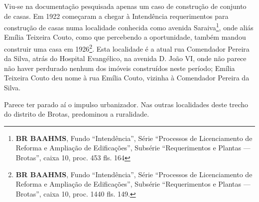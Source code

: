Viu-se na documentação pesquisada apenas um caso de construção de conjunto de casas. Em 1922 começaram a chegar à Intendência requerimentos para construção de casas numa localidade conhecida como avenida Saraiva\footnote{\textbf{BR BAAHMS}, Fundo ``Intendência'', Série ``Processos de Licenciamento de Reforma e Ampliação de Edificações'', Subsérie ``Requerimentos e Plantas --- Brotas'', caixa 10, proc. 453 fls. 164}, onde aliás Emília Teixeira Couto, como que percebendo a oportunidade, também mandou construir uma casa em 1926\footnote{\textbf{BR BAAHMS}, Fundo ``Intendência'', Série ``Processos de Licenciamento de Reforma e Ampliação de Edificações'', Subsérie ``Requerimentos e Plantas --- Brotas'', caixa 10, proc. 1440 fls. 149.}. Esta localidade é a atual rua Comendador Pereira da Silva, atrás do Hospital Evangélico, na avenida D. João VI, onde não parece não haver perdurado nenhum dos imóveis construídos neste período; Emília Teixeira Couto deu nome à rua Emília Couto, vizinha à Comendador Pereira da Silva.


Parece ter parado aí o impulso urbanizador. Nas outras localidades deste trecho do distrito de Brotas, predominou a ruralidade.

